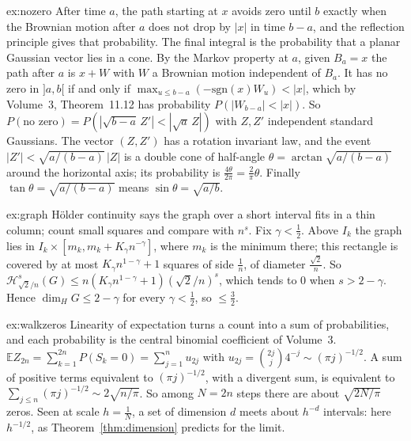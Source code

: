\begin{solution}{ex:nozero}
\idea After time $a$, the path starting at $x$ avoids zero until $b$ exactly when the Brownian motion after $a$ does not drop by $|x|$ in time $b-a$, and the reflection principle gives that probability. The final
integral is the probability that a planar Gaussian vector lies in a cone.
\writeup By the Markov property at $a$, given $B_a=x$ the path after $a$ is $x+W$ with $W$ a Brownian motion independent of $B_a$. It has no zero in $]a,b[$ if and only if $\max_{u\le b-a}(-\mathrm{sgn}(x)W_u)<|x|$, which by
Volume~3, Theorem~11.12 has probability $P(|W_{b-a}|<|x|)$. So $P(\text{no zero})=P(|\sqrt{b-a}\,Z'|<|\sqrt a\,Z|)$ with $Z,Z'$ independent standard Gaussians. The vector $(Z,Z')$ has a rotation invariant law, and the event
$|Z'|<\sqrt{a/(b-a)}\,|Z|$ is a double cone of half-angle $\theta=\arctan\sqrt{a/(b-a)}$ around the horizontal axis; its probability is $\frac{4\theta}{2\pi}=\frac2\pi\theta$. Finally $\tan\theta=\sqrt{a/(b-a)}$ means $\sin\theta=\sqrt{a/b}$.
\end{solution}

\begin{solution}{ex:graph}
\idea Hölder continuity says the graph over a short interval fits in a thin column; count small squares and compare with $n^s$.
\writeup Fix $\gamma<\frac12$. Above $I_k$ the graph lies in $I_k\times[m_k,m_k+K_\gamma n^{-\gamma}]$, where $m_k$ is the minimum there; this rectangle is covered by at most $K_\gamma n^{1-\gamma}+1$ squares of side
$\frac1n$, of diameter $\frac{\sqrt2}n$. So $\mathcal H^s_{\sqrt2/n}(G)\le n(K_\gamma n^{1-\gamma}+1)(\sqrt2/n)^s$, which tends to $0$ when $s>2-\gamma$. Hence $\dim_HG\le2-\gamma$ for every $\gamma<\frac12$, so $\le\frac32$.
\end{solution}

\begin{solution}{ex:walkzeros}
\idea Linearity of expectation turns a count into a sum of probabilities, and each probability is the central binomial coefficient of Volume~3.
\writeup $\mathbb E Z_{2n}=\sum_{k=1}^{2n}P(S_k=0)=\sum_{j=1}^nu_{2j}$ with $u_{2j}=\binom{2j}j4^{-j}\sim(\pi j)^{-1/2}$. A sum of positive terms equivalent to $(\pi j)^{-1/2}$, with a divergent sum, is equivalent to
$\sum_{j\le n}(\pi j)^{-1/2}\sim2\sqrt{n/\pi}$. So among $N=2n$ steps there are about $\sqrt{2N/\pi}$ zeros. Seen at scale $h=\frac1N$, a set of dimension $d$ meets about $h^{-d}$ intervals: here $h^{-1/2}$, as
Theorem~\ref{thm:dimension} predicts for the limit.
\end{solution}


